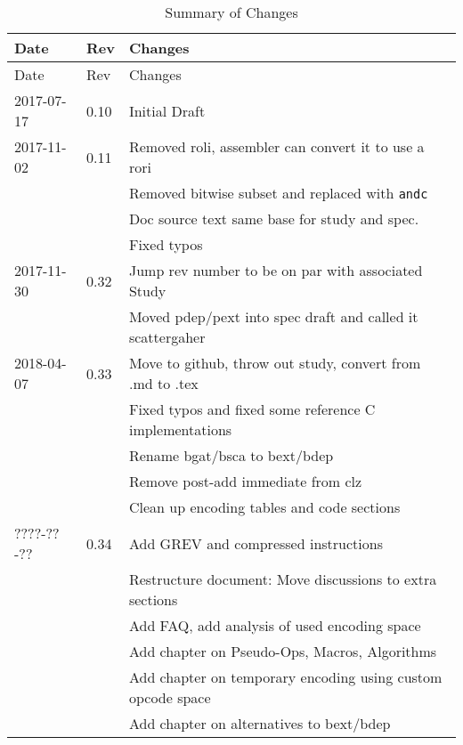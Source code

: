 \documentclass[twoside,11pt]{book}
\begin{document}
\begin{longtable}[c]{@{}lll@{}}
\caption{Summary of Changes}\tabularnewline
\toprule
Date & Rev & Changes\tabularnewline
\midrule
\endfirsthead
\toprule
Date & Rev & Changes\tabularnewline
\midrule
\endhead
2017-07-17 & 0.10 & Initial Draft\tabularnewline
2017-11-02 & 0.11 & Removed roli, assembler can convert it to use a rori\tabularnewline
           &      & Removed bitwise subset and replaced with \texttt{andc}\tabularnewline
           &      & Doc source text same base for study and spec.\tabularnewline
           &      & Fixed typos\tabularnewline
2017-11-30 & 0.32 & Jump rev number to be on par with associated Study\tabularnewline
           &      & Moved pdep/pext into spec draft and called it scattergaher\tabularnewline
2018-04-07 & 0.33 & Move to github, throw out study, convert from .md to .tex\tabularnewline
           &      & Fixed typos and fixed some reference C implementations\tabularnewline
           &      & Rename bgat/bsca to bext/bdep\tabularnewline
           &      & Remove post-add immediate from clz\tabularnewline
           &      & Clean up encoding tables and code sections\tabularnewline
????-??-?? & 0.34 & Add GREV and compressed instructions\tabularnewline
           &      & Restructure document: Move discussions to extra sections\tabularnewline
           &      & Add FAQ, add analysis of used encoding space\tabularnewline
           &      & Add chapter on Pseudo-Ops, Macros, Algorithms\tabularnewline
           &      & Add chapter on temporary encoding using custom opcode space\tabularnewline
           &      & Add chapter on alternatives to bext/bdep\tabularnewline
\bottomrule
\end{longtable}

% 
% 
\end{document}
